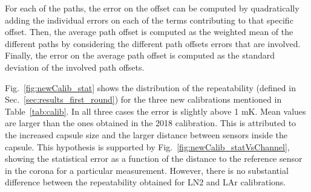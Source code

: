 For each of the paths, the error on the offset can be computed by quadratically adding the individual errors on each of the terms contributing to that specific offset. Then, the average path offset is computed as the weighted mean of the different paths by considering the different path offsets errors that are involved. Finally, the error on the average path offset is computed as the standard deviation of the involved path offsets.

Fig.~\ref{fig:newCalib_stat} shows the distribution of the repeatability (defined in Sec.~\ref{sec:results_first_round}) for the three new calibrations mentioned in Table~\ref{tab:calib}. In all three cases the error is slightly above 1 mK. Mean values are larger than the ones obtained in the 2018 calibration. This is attributed to the increased capsule size and the larger distance between sensors inside the capsule. This hypothesis is supported by Fig.~\ref{fig:newCalib_statVsChannel}, showing the statistical error as a function of the distance to the reference sensor in the corona for a particular measurement. However, there is no substantial difference between the repeatability obtained for LN2 and LAr calibrations.



